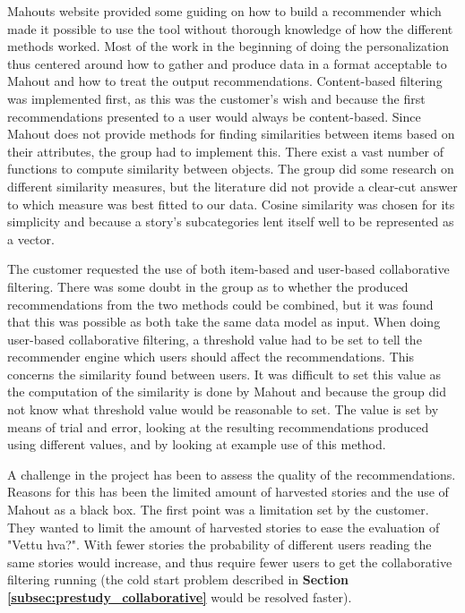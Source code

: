 Mahouts website provided some guiding on how to build a recommender which made it possible to use the tool without thorough knowledge of how the different methods worked. Most of the work in the beginning of doing the personalization thus centered around how to gather and produce data in a format acceptable to Mahout and how to treat the output recommendations. Content-based filtering was implemented first, as this was the customer's wish and because the first recommendations presented to a user would always be content-based. Since Mahout does not provide methods for finding similarities between items based on their attributes, the group had to implement this. There exist a vast number of functions to compute similarity between objects. The group did some research on different similarity measures, but the literature did not provide a clear-cut answer to which measure was best fitted to our data. Cosine similarity was chosen for its simplicity and because a story's subcategories lent itself well to be represented as a vector.\newline

The customer requested the use of both item-based and user-based collaborative filtering. There was some doubt in the group as to whether the produced recommendations from the two methods could be combined, but it was found that this was possible as both take the same data model as input. When doing user-based collaborative filtering, a threshold value had to be set to tell the recommender engine which users should affect the recommendations. This concerns the similarity found between users. It was difficult to set this value as the computation of the similarity is done by Mahout and because the group did not know what threshold value would be reasonable to set. The value is set by means of trial and error, looking at the resulting recommendations produced using different values, and by looking at example use of this method. \newline

A challenge in the project has been to assess the quality of the recommendations. Reasons for this has been the limited amount of harvested stories and the use of Mahout as a black box. The first point was a limitation set by the customer. They wanted to limit the amount of harvested stories to ease the evaluation of "Vettu hva?". With fewer stories the probability of different users reading the same stories would increase, and thus require fewer users to get the collaborative filtering running (the cold start problem described in \textbf{Section \ref{subsec:prestudy_collaborative}} would be resolved faster). \newline

